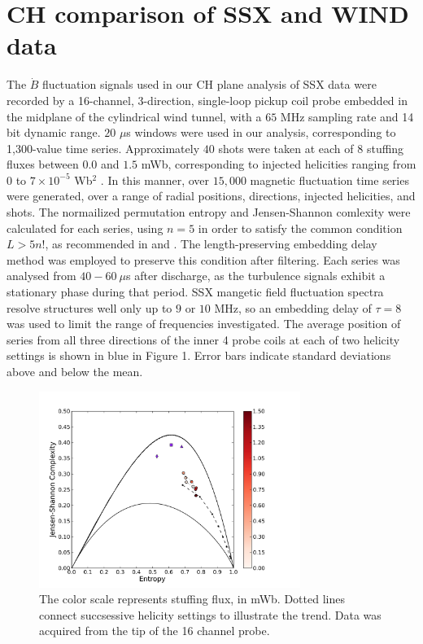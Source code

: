 \documentclass[aps,twocolumn,secnumarabic,nobalancelastpage,amsmath,amssymb,
nofootinbib]{revtex4-1}
\begin{document}
\section{CH comparison of SSX and WIND data}
The $\dot{B}$ fluctuation signals used in our CH plane analysis of SSX data  were recorded by a 16-channel, 3-direction, single-loop pickup coil probe embedded in the midplane of the cylindrical wind tunnel, with a $65$ MHz sampling rate and 14 bit dynamic range. $20$ $\mu$s windows were used in our analysis, corresponding to 1,300-value time series. Approximately $40$ shots were taken at each of $8$ stuffing fluxes between $0.0$ and $1.5$ mWb, corresponding to injected helicities ranging from $0$ to $7 \times 10^{-5}$ Wb$^2$ \cite{schaffner2014}. In this manner, over $15,000$ magnetic fluctuation time series were generated, over a range of radial positions, directions, injected helicities, and shots. The normailized permutation entropy and Jensen-Shannon comlexity were calculated for each series, using $n=5$ in order to satisfy the common condition $L > 5n!$, as recommended in \cite{amigo2008} and \cite{riedl2013}. The length-preserving embedding delay method was employed to preserve this condition after filtering. Each series was analysed from $40-60~\mu$s after discharge, as the turbulence signals exhibit a stationary phase during that period. SSX mangetic field fluctuation spectra resolve structures well only up to $9$ or $10$ MHz, so an embedding delay of $\tau=8$ was used to limit the range of frequencies investigated. The average position of series from all three directions of the inner 4 probe coils at each of two helicity settings is shown in blue in Figure 1. Error bars indicate standard deviations above and below the mean.  

\begin{figure}[!htbp]
\centerline{
\includegraphics[width=8.5cm]{fig2.png}}
\caption{\label{Figure 2} The color scale represents stuffing flux, in mWb. Dotted lines connect succsessive helicity settings to illustrate the trend. Data was acquired from the tip of the 16 channel probe.}
\end{figure}
\end{document}

